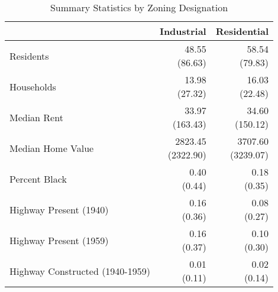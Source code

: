 \begin{table}[h]
\centering
\caption{Summary Statistics by Zoning Designation}
\label{tab:summary_stats_zone}
\begin{tabular*}{\linewidth}{@{\extracolsep{\fill}}l*{2}{r}}
\toprule
 & Industrial & Residential \\
\midrule
Residents & \makecell[tr]{48.55 \\ (86.63)} & \makecell[tr]{58.54 \\ (79.83)} \\
Households & \makecell[tr]{13.98 \\ (27.32)} & \makecell[tr]{16.03 \\ (22.48)} \\
Median Rent & \makecell[tr]{33.97 \\ (163.43)} & \makecell[tr]{34.60 \\ (150.12)} \\
Median Home Value & \makecell[tr]{2823.45 \\ (2322.90)} & \makecell[tr]{3707.60 \\ (3239.07)} \\
Percent Black & \makecell[tr]{0.40 \\ (0.44)} & \makecell[tr]{0.18 \\ (0.35)} \\
Highway Present (1940) & \makecell[tr]{0.16 \\ (0.36)} & \makecell[tr]{0.08 \\ (0.27)} \\
Highway Present (1959) & \makecell[tr]{0.16 \\ (0.37)} & \makecell[tr]{0.10 \\ (0.30)} \\
Highway Constructed (1940-1959) & \makecell[tr]{0.01 \\ (0.11)} & \makecell[tr]{0.02 \\ (0.14)} \\
\bottomrule
\end{tabular*}
\end{table}
